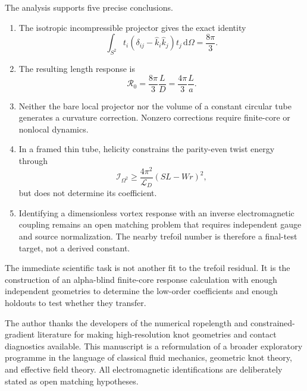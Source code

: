\documentclass[aps,pre,preprint,notitlepage,nofootinbib,superscriptaddress]{revtex4-2}
\newcommand{\dd}{\mathrm d}
\newcommand{\calL}{\mathcal L}
\newcommand{\calI}{\mathcal I}
\newcommand{\Rgeom}{\mathscr R_{0}}
\begin{document}
The analysis supports five precise conclusions.
\begin{enumerate}[leftmargin=*]
  \item The isotropic incompressible projector gives the exact identity
  \begin{equation*}
    \int_{S^2}t_i(\delta_{ij}-\widehat k_i\widehat k_j)t_j\,\dd\Omega
    =\frac{8\pi}{3}.
  \end{equation*}
  \item The resulting length response is
  \begin{equation*}
    \Rgeom=\frac{8\pi}{3}\frac{L}{D}
    =\frac{4\pi}{3}\frac{L}{a}.
  \end{equation*}
  \item Neither the bare local projector nor the volume of a constant circular tube generates a curvature correction.  Nonzero corrections require finite-core or nonlocal dynamics.
  \item In a framed thin tube, helicity constrains the parity-even twist energy through
  \begin{equation*}
    \calI_{\Omega^2}\ge
    \frac{4\pi^2}{\calL_D}(SL-Wr)^2,
  \end{equation*}
  but does not determine its coefficient.
  \item Identifying a dimensionless vortex response with an inverse electromagnetic coupling remains an open matching problem that requires independent gauge and source normalization.  The nearby trefoil number is therefore a final-test target, not a derived constant.
\end{enumerate}

The immediate scientific task is not another fit to the trefoil residual.  It is the construction of an alpha-blind finite-core response calculation with enough independent geometries to determine the low-order coefficients and enough holdouts to test whether they transfer.

\begin{acknowledgments}
The author thanks the developers of the numerical ropelength and constrained-gradient literature for making high-resolution knot geometries and contact diagnostics available.  This manuscript is a reformulation of a broader exploratory programme in the language of classical fluid mechanics, geometric knot theory, and effective field theory.  All electromagnetic identifications are deliberately stated as open matching hypotheses.
\end{acknowledgments}
\end{document}
